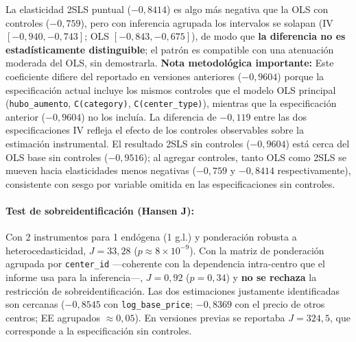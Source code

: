 \documentclass[doc, a4paper, biblatex, floatsintext, longtable, babel]{apa7}
\begin{document}
La elasticidad 2SLS puntual ($-0,8414$) es algo m\'as negativa que la OLS con controles ($-0,759$), pero con inferencia agrupada los intervalos se solapan (IV $[-0,940, -0,743]$; OLS $[-0,843, -0,675]$), de modo que \textbf{la diferencia no es estadísticamente distinguible}; el patrón es compatible con una atenuación moderada del OLS, sin demostrarla. \textbf{Nota metodológica importante:} Este coeficiente difiere del reportado en versiones anteriores ($-0,9604$) porque la especificación actual incluye los mismos controles que el modelo OLS principal (\texttt{hubo\_aumento}, \texttt{C(category)}, \texttt{C(center\_type)}), mientras que la especificación anterior ($-0,9604$) no los incluía. La diferencia de $-0,119$ entre las dos especificaciones IV refleja el efecto de los controles observables sobre la estimación instrumental. El resultado 2SLS sin controles ($-0,9604$) est\'a cerca del OLS base sin controles ($-0,9516$); al agregar controles, tanto OLS como 2SLS se mueven hacia elasticidades menos negativas ($-0,759$ y $-0,8414$ respectivamente), consistente con sesgo por variable omitida en las especificaciones sin controles.

\paragraph{Test de sobreidentificaci\'on (Hansen J):} Con 2 instrumentos para 1 end\'ogena (1 g.l.) y ponderación robusta a heterocedasticidad, $J = 33,28$ ($p \approx 8 \times 10^{-9}$). Con la matriz de ponderación agrupada por \texttt{center\_id} ---coherente con la dependencia intra-centro que el informe usa para la inferencia---, $J = 0,92$ ($p = 0,34$) y \textbf{no se rechaza} la restricción de sobreidentificación. Las dos estimaciones justamente identificadas son cercanas ($-0,8545$ con \texttt{log\_base\_price}; $-0,8369$ con el precio de otros centros; EE agrupados $\approx 0,05$). En versiones previas se reportaba $J=324,5$, que corresponde a la especificación sin controles.
\end{document}
